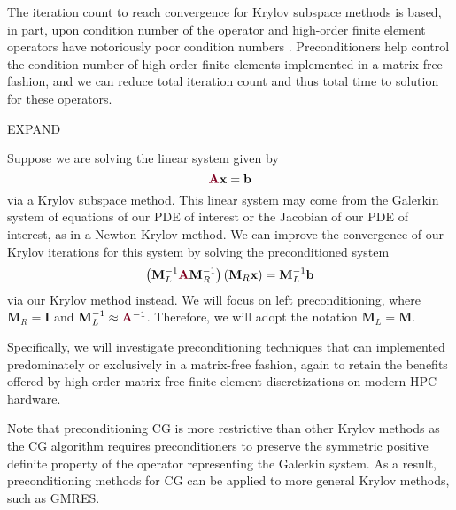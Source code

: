 The iteration count to reach convergence for Krylov subspace methods is based, in part, upon condition number of the operator \cite{luenberger1973introduction} and high-order finite element operators have notoriously poor condition numbers \cite{hu1998bounds}.
Preconditioners help control the condition number of high-order finite elements implemented in a matrix-free fashion, and we can reduce total iteration count and thus total time to solution for these operators.

EXPAND

Suppose we are solving the linear system given by
\begin{equation}
{\color{burgundy}\mathbf{A}} \mathbf{x} = \mathbf{b}
\label{linear_eqn}
\end{equation}
via a Krylov subspace method.
This linear system may come from the Galerkin system of equations of our PDE of interest or the Jacobian of our PDE of interest, as in a Newton-Krylov method.
We can improve the convergence of our Krylov iterations for this system by solving the preconditioned system
\begin{equation}
\left( \mathbf{M}_L^{-1} {\color{burgundy}\mathbf{A}} \mathbf{M}_R^{-1} \right) \left( \mathbf{M}_R \mathbf{x} \right) = \mathbf{M}_L^{-1} \mathbf{b}
\label{precond_eqn}
\end{equation}
via our Krylov method instead.
We will focus on left preconditioning, where $\mathbf{M}_R = \mathbf{I}$ and $\mathbf{M}_L^{-1} \approx {\color{burgundy}\mathbf{A}}^{-1}$.
Therefore, we will adopt the notation $\mathbf{M}_L = \mathbf{M}$.

Specifically, we will investigate preconditioning techniques that can implemented predominately or exclusively in a matrix-free fashion, again to retain the benefits offered by high-order matrix-free finite element discretizations on modern HPC hardware.

Note that preconditioning CG is more restrictive than other Krylov methods as the CG algorithm requires preconditioners to preserve the symmetric positive definite property of the operator representing the Galerkin system.
As a result, preconditioning methods for CG can be applied to more general Krylov methods, such as GMRES.
